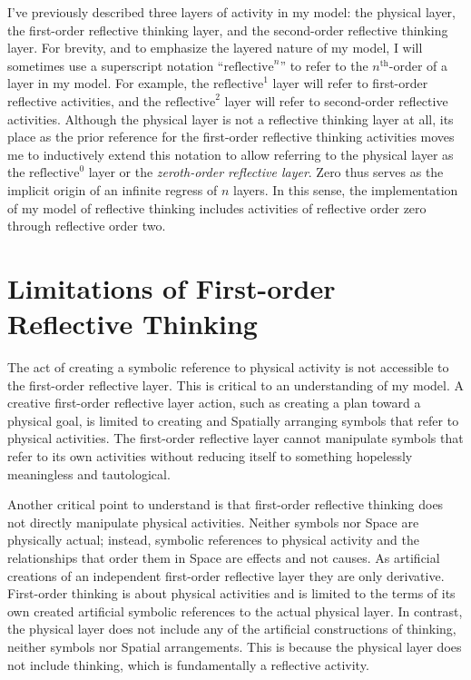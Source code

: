 I've previously described three layers of activity in my model: the
physical layer, the first-order reflective thinking layer, and the
second-order reflective thinking layer.  For brevity, and to emphasize
the layered nature of my model, I will sometimes use a superscript
notation ``$\text{reflective}^n$'' to refer to the $n^\text{th}$-order
of a layer in my model.  For example, the $\text{reflective}^1$ layer
will refer to first-order reflective activities, and the
$\text{reflective}^2$ layer will refer to second-order reflective
activities.  Although the physical layer is not a reflective thinking
layer at all, its place as the prior reference for the first-order
reflective thinking activities moves me to inductively extend this
notation to allow referring to the physical layer as the
$\text{reflective}^0$ layer or the \emph{zeroth-order reflective
  layer}.  Zero thus serves as the implicit origin of an infinite
regress of $n$ layers.  In this sense, the implementation of my model
of reflective thinking includes activities of reflective order zero
through reflective order two.

\section{Limitations of First-order Reflective Thinking}

The act of creating a symbolic reference to physical activity is not
accessible to the first-order reflective layer.  This is critical to
an understanding of my model.  A creative first-order reflective layer
action, such as creating a plan toward a physical goal, is limited to
creating and Spatially arranging symbols that refer to physical
activities.  The first-order reflective layer cannot manipulate
symbols that refer to its own activities without reducing itself to
something hopelessly meaningless and tautological.

Another critical point to understand is that first-order reflective
thinking does not directly manipulate physical activities.  Neither
symbols nor Space are physically actual; instead, symbolic references
to physical activity and the relationships that order them in Space
are effects and not causes.  As artificial creations of an independent
first-order reflective layer they are only derivative.  First-order
thinking is about physical activities and is limited to the terms of
its own created artificial symbolic references to the actual physical
layer.  In contrast, the physical layer does not include any of the
artificial constructions of thinking, neither symbols nor Spatial
arrangements.  This is because the physical layer does not include
thinking, which is fundamentally a reflective activity.

